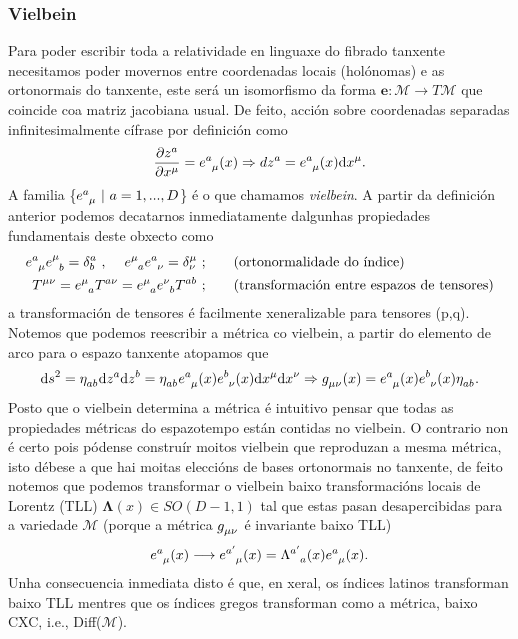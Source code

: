 \subsubsection{Vielbein}
Para poder escribir toda a relatividade en linguaxe do fibrado tanxente necesitamos poder movernos entre coordenadas locais (holónomas) e as ortonormais do tanxente, este será un isomorfismo da forma $\textbf{e}:\mathcal{M}\longrightarrow T\mathcal{M}$ que coincide coa matriz jacobiana usual. De feito, acción sobre coordenadas separadas infinitesimalmente cífrase por definición como
\begin{align}
    \diffp{z^a}{x^\mu}=\viel(x)\Rightarrow dz^a = \viel(x)\dd x^\mu.
\end{align}
A familia \{$\viel\ |\ a=1,...,D$\} é o que chamamos \textit{vielbein}. A partir da definición anterior podemos decatarnos inmediatamente dalgunhas propiedades fundamentais deste obxecto como
\begin{align}
    \viel e\indices{^\mu_b}= \delta^a_b\ ,\hspace{1.2em} e\indices{^\mu_a} e\indices{^a_\nu} =\delta^\mu_\nu\ ;\hspace{2em} &\text{(ortonormalidade do índice)}\\
    T\indices{^\mu^\nu}= \vieli T\indices{^a^\nu} = \vieli\bieli T\indices{^a^b}\ ;\hspace{2em} &\text{(transformación entre espazos de tensores)}
\end{align}
a transformación de tensores é facilmente xeneralizable para tensores (p,q). Notemos que podemos reescribir a métrica co vielbein, a partir do elemento de arco para o espazo tanxente atopamos que 
\begin{align}
    \dd s^2 =\eta\indices{_a_b}\dd z^a\dd z^b = \eta\indices{_a_b}\viel(x)\biel(x)\dd x^\mu\dd x^\nu\Rightarrow g\indices{_\mu_\nu}(x) = \viel(x)\biel(x)\eta\indices{_a_b}. 
\end{align}
Posto que o vielbein determina a métrica é intuitivo pensar que todas as propiedades métricas do espazotempo están contidas no vielbein. O contrario non é certo pois pódense construír moitos vielbein que reproduzan a mesma métrica, isto débese a que hai moitas eleccións de bases ortonormais no tanxente, de feito notemos que podemos transformar o vielbein baixo transformacións locais de Lorentz (TLL) ${\mathbf{\Lambda}(x)\in SO(D-1,1)}$ tal que estas pasan desapercibidas para a variedade $\mathcal{M}$ (porque a métrica $g\indices{_\mu_\nu}$ é invariante baixo TLL)
\begin{align}
    \viel(x)\longrightarrow e\indices{^{a'}_\mu}(x) = \Lambda\indices{^{a'}_a}(x)\viel(x).
\end{align}
Unha consecuencia inmediata disto é que, en xeral, os índices latinos transforman baixo TLL mentres que os índices gregos transforman como a métrica, baixo CXC, i.e., Diff($\mathcal{M}$).

